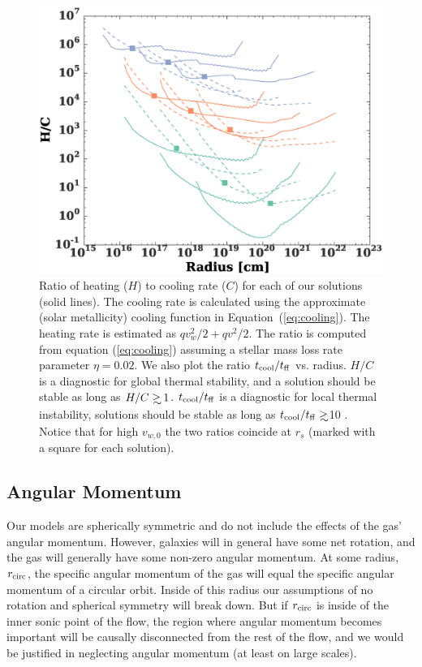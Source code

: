 \documentclass[usenatbib,fleqn]{mn2e}
\newcommand\gsim{\mathrel{\rlap{\lower4pt\hbox{\hskip1pt$\sim$}}
    \raise1pt\hbox{$>$}}}
\newcommand{\rs}{r_s}
\newcommand{\rcirc}{r_{\rm circ}}
\newcommand{\vw}{v_w}
\newcommand{\vwO}{v_{w,0}}
\newcommand{\tcool}{t_{\rm cool}}
\newcommand{\tff}{t_{\rm ff}}
\begin{document}
\begin{figure}
  \includegraphics[width=\columnwidth]{cooling.eps}
  \caption{\label{fig:cooling} Ratio of heating ($H$) to cooling rate
    ($C$) for each of our solutions (solid lines). The cooling rate is
    calculated using the approximate (solar metallicity) cooling
    function in Equation~(\ref{eq:cooling}). The heating rate is
    estimated as $q \vw^2/2+q v^2/2$. The ratio is computed from
    equation (\ref{eq:cooling}) assuming a stellar mass loss rate
    parameter $\eta=0.02$. We also plot the ratio $\tcool/\tff$
    vs. radius. $H/C$ is a diagnostic for global thermal stability,
    and a solution should be stable as long as
    $H/C\gsim1$. $\tcool/\tff$ is a diagnostic for local thermal
    instability, solutions should be stable as long as $\tcool/t_{\rm
      ff}\gsim$10 \citealt{McCourt+12}. Notice that for high $\vwO$
    the two ratios coincide at $\rs$ (marked with a square for each
    solution).}
\end{figure}


%


  \subsection{Angular Momentum}
  \label{sec:ang}
  Our models are spherically symmetric and do not include the effects of
  the gas' angular momentum. However, galaxies will in general have some
  net rotation, and the gas will generally have some non-zero angular
  momentum. At some radius, $\rcirc$, the specific angular momentum of
  the gas will equal the specific angular momentum of a circular
  orbit. Inside of this radius our assumptions of no rotation and
  spherical symmetry will break down. But if $\rcirc$ is inside of the
  inner sonic point of the flow, the region where angular momentum
  becomes important will be causally disconnected from the rest of the
  flow, and we would be justified in neglecting angular momentum (at
  least on large scales).
\end{document}
